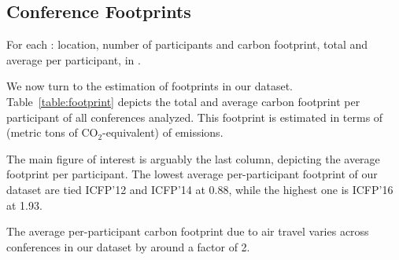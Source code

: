 \subsection{Conference Footprints}


\begin{table}
  \centering
  \caption{For each \event: location, number of participants and carbon footprint,
    total and average per participant, in \gazunitbis. }
  \label{table:footprint}
\end{table}

We now turn to the estimation of footprints in our dataset.
Table~\ref{table:footprint} depicts the total and average carbon footprint per participant of
all conferences analyzed. This footprint is estimated in terms of \gazunitbis{}
(metric tons of CO$_2$-equivalent) of emissions.

The main figure of interest is arguably the last column, depicting the
average footprint per participant.  The lowest average per-participant footprint of
our dataset are tied ICFP'12 and ICFP'14 at 0.88\gazunitbis, while the
highest one is ICFP'16 at 1.93\gazunitbis.

\begin{obs}
The average per-participant carbon footprint due to air travel varies across
conferences in our dataset by around a factor of 2.
\label{obs:footprint}
\end{obs}
